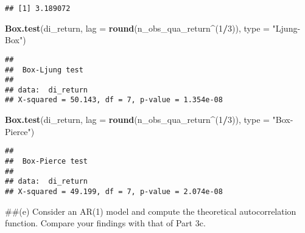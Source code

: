 \documentclass[
]{article}
\newenvironment{Shaded}{\begin{snugshade}}{\end{snugshade}}
\newcommand{\AttributeTok}[1]{\textcolor[rgb]{0.13,0.29,0.53}{#1}}
\newcommand{\ConstantTok}[1]{\textcolor[rgb]{0.56,0.35,0.01}{#1}}
\newcommand{\DecValTok}[1]{\textcolor[rgb]{0.00,0.00,0.81}{#1}}
\newcommand{\FunctionTok}[1]{\textcolor[rgb]{0.13,0.29,0.53}{\textbf{#1}}}
\newcommand{\NormalTok}[1]{#1}
\newcommand{\OtherTok}[1]{\textcolor[rgb]{0.56,0.35,0.01}{#1}}
\newcommand{\SpecialCharTok}[1]{\textcolor[rgb]{0.81,0.36,0.00}{\textbf{#1}}}
\newcommand{\StringTok}[1]{\textcolor[rgb]{0.31,0.60,0.02}{#1}}
\begin{document}
\begin{verbatim}
## [1] 3.189072
\end{verbatim}

\begin{Shaded}
\begin{Highlighting}[]
\FunctionTok{Box.test}\NormalTok{(di\_return, }\AttributeTok{lag =} \FunctionTok{round}\NormalTok{(n\_obs\_qua\_return}\SpecialCharTok{\^{}}\NormalTok{(}\DecValTok{1}\SpecialCharTok{/}\DecValTok{3}\NormalTok{)), }\AttributeTok{type =} \StringTok{"Ljung{-}Box"}\NormalTok{) }
\end{Highlighting}
\end{Shaded}

\begin{verbatim}
## 
##  Box-Ljung test
## 
## data:  di_return
## X-squared = 50.143, df = 7, p-value = 1.354e-08
\end{verbatim}

\begin{Shaded}
\begin{Highlighting}[]
\FunctionTok{Box.test}\NormalTok{(di\_return, }\AttributeTok{lag =} \FunctionTok{round}\NormalTok{(n\_obs\_qua\_return}\SpecialCharTok{\^{}}\NormalTok{(}\DecValTok{1}\SpecialCharTok{/}\DecValTok{3}\NormalTok{)), }\AttributeTok{type =} \StringTok{"Box{-}Pierce"}\NormalTok{)}
\end{Highlighting}
\end{Shaded}

\begin{verbatim}
## 
##  Box-Pierce test
## 
## data:  di_return
## X-squared = 49.199, df = 7, p-value = 2.074e-08
\end{verbatim}

\#\#(e) Consider an AR(1) model and compute the theoretical
autocorrelation function. Compare your findings with that of Part 3c.

\begin{Shaded}
\end{Shaded}
\end{document}

